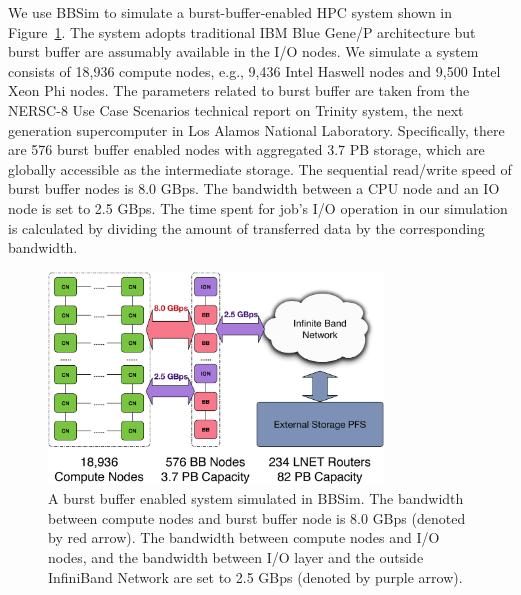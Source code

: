 We use BBSim to simulate
a burst-buffer-enabled HPC system shown in Figure~\ref{Fig:BBArchitecture}.
The system adopts traditional IBM Blue Gene/P architecture but burst buffer are
assumably available in the I/O nodes.
We simulate a system consists of 18,936 compute nodes,
e.g., 9,436 Intel Haswell nodes and 9,500 Intel Xeon Phi nodes.
The parameters related to burst buffer are taken from the 
NERSC-8 Use Case Scenarios technical report\cite{BBUseCase} on Trinity system\cite{TrinitySystem},
the next generation supercomputer in Los Alamos National Laboratory.
Specifically, there are 576 burst buffer enabled nodes with aggregated 3.7 PB storage,
which are globally accessible as the intermediate storage.
The sequential read/write speed of burst buffer nodes is 8.0 GBps.
The bandwidth between a CPU node and an IO node is set to 2.5 GBps.
The time spent for job's I/O operation in our simulation is calculated by
dividing the amount of transferred data by the corresponding bandwidth.

\begin{figure}[htp]
        \centering
        \includegraphics[width=3.5in]{BBArchitecturewithBandwidth}
        \caption{A burst buffer enabled system simulated in BBSim. The bandwidth between compute nodes and burst buffer node is 8.0 GBps (denoted by red arrow). The bandwidth between compute nodes and I/O nodes, and the bandwidth between I/O layer and the outside InfiniBand Network are set to 2.5 GBps (denoted by purple arrow).}
\label{Fig:BBArchitecture}
\end{figure}

